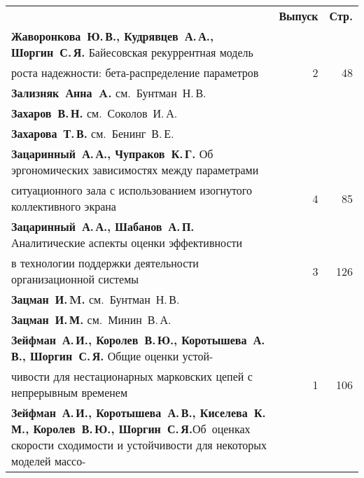 {\tabcolsep=3pt
\begin{tabular}{p{388pt}rr}
&\textbf{Выпуск} & \textbf{Стр.}\\[3pt]
\textbf{Жаворонкова~Ю.\,В., Кудрявцев~А.\,А., Шоргин~С.\,Я.} Байесовская рекуррентная
модель\linebreak
\vspace*{-12pt}\\
\hspace*{23pt}роста надежности: бета-распределение параметров\dotfill&2&48\\
\textbf{Зализняк~Анна~A.} см.\ Бунтман~Н.\,В.&&\\
\textbf{Захаров~В.\,Н.} см.\ Соколов~И.\,А.&&\\
\textbf{Захарова~Т.\,В.} см.\ Бенинг~В.\,Е.&&\\
\textbf{Зацаринный~А.\,А., Чупраков~К.\,Г.} Об эргономических зависимостях между
параметрами\linebreak
\vspace*{-12pt}\\
\hspace*{23pt}ситуационного зала с использованием изогнутого коллективного
экрана\dotfill&4&85\\
\textbf{Зацаринный~А.\,А., Шабанов~А.\,П.} Аналитические аспекты оценки
эффективности\linebreak
\vspace*{-12pt}\\
\hspace*{23pt}в технологии поддержки деятельности организационной системы\dotfill&3&126\\
\textbf{Зацман~И.\,M.} см.\ Бунтман~Н.\,В.&&\\
\textbf{Зацман~И.\,М.} см.\ Минин~В.\,А.&&\\
\textbf{Зейфман~А.\,И., Королев~В.\,Ю., Коротышева~А.\,В., Шоргин~С.\,Я.} Общие
оценки устой-\linebreak
\vspace*{-12pt}\\
\hspace*{23pt}чивости для нестационарных марковских цепей с непрерывным
временем\dotfill&1&106\\
\hangindent=23pt\noindent\textbf{Зейфман~А.\,И., Коротышева~А.\,В., Киселева~К.\,М., Королев~В.\,Ю.,
Шоргин~С.\,Я.}\linebreak Об~оценках скорости сходимости и устойчивости для некоторых моделей
мас\-со-\linebreak
\vspace*{-12pt}\\

\end{tabular}}
